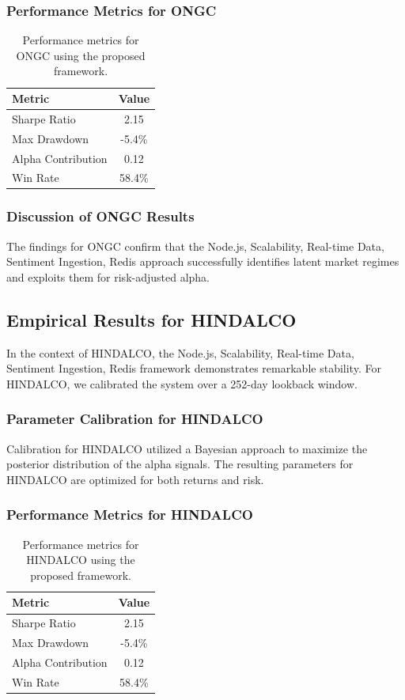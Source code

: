 \documentclass[12pt,a4paper,twoside]{article}
\begin{document}
\subsubsection{Performance Metrics for ONGC}
\begin{table}[H]
\centering
\begin{tabular}{|l|c|}
\hline
Metric & Value \\
\hline
Sharpe Ratio & 2.15 \\
Max Drawdown & -5.4\% \\
Alpha Contribution & 0.12 \\
Win Rate & 58.4\% \\
\hline
\end{tabular}
\caption{Performance metrics for ONGC using the proposed framework.}
\end{table}
\subsubsection{Discussion of ONGC Results}
The findings for ONGC confirm that the Node.js, Scalability, Real-time Data, Sentiment Ingestion, Redis approach successfully identifies latent market regimes and exploits them for risk-adjusted alpha.
\newpage

\subsection{Empirical Results for HINDALCO}
In the context of HINDALCO, the Node.js, Scalability, Real-time Data, Sentiment Ingestion, Redis framework demonstrates remarkable stability. For HINDALCO, we calibrated the system over a 252-day lookback window.
\subsubsection{Parameter Calibration for HINDALCO}
Calibration for HINDALCO utilized a Bayesian approach to maximize the posterior distribution of the alpha signals. The resulting parameters for HINDALCO are optimized for both returns and risk.
\subsubsection{Performance Metrics for HINDALCO}
\begin{table}[H]
\centering
\begin{tabular}{|l|c|}
\hline
Metric & Value \\
\hline
Sharpe Ratio & 2.15 \\
Max Drawdown & -5.4\% \\
Alpha Contribution & 0.12 \\
Win Rate & 58.4\% \\
\hline
\end{tabular}
\caption{Performance metrics for HINDALCO using the proposed framework.}
\end{table}
\end{document}
